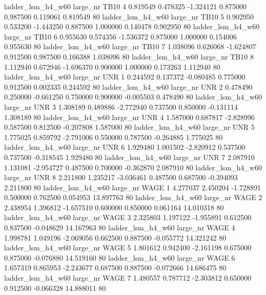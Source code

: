   ladder_lsm_h4_w60   large_nr     TB10                 4  0.819549  0.478325  -1.324121 0.875000 0.987500  0.119061    0.819549 80
  ladder_lsm_h4_w60   large_nr     TB10                 5  0.902950  0.533200  -1.443250 0.887500 1.000000  0.140478    0.902950 80
  ladder_lsm_h4_w60   large_nr     TB10                 6  0.955630  0.574356  -1.536372 0.875000 1.000000  0.154006    0.955630 80
  ladder_lsm_h4_w60   large_nr     TB10                 7  1.038096  0.626068  -1.624807 0.912500 0.987500  0.166388    1.038096 80
  ladder_lsm_h4_w60   large_nr     TB10                 8  1.112940  0.672946  -1.696370 0.900000 1.000000  0.173263    1.112940 80
  ladder_lsm_h4_w60   large_nr      UNR                 1  0.244592  0.137372  -0.080485 0.775000 0.912500  0.002335    0.244592 80
  ladder_lsm_h4_w60   large_nr      UNR                 2  0.478490  0.250000  -0.661250 0.750000 0.900000 -0.005503    0.478490 80
  ladder_lsm_h4_w60   large_nr      UNR                 3  1.308189  0.489886  -2.772940 0.737500 0.850000 -0.131114    1.308189 80
  ladder_lsm_h4_w60   large_nr      UNR                 4  1.587000  0.687817  -2.828996 0.587500 0.812500 -0.207808    1.587000 80
  ladder_lsm_h4_w60   large_nr      UNR                 5  1.775025  0.859792  -2.791006 0.550000 0.787500 -0.264885    1.775025 80
  ladder_lsm_h4_w60   large_nr      UNR                 6  1.929480  1.001502  -2.820912 0.537500 0.737500 -0.318545    1.929480 80
  ladder_lsm_h4_w60   large_nr      UNR                 7  2.087910  1.131081  -2.954727 0.487500 0.700000 -0.362870    2.087910 80
  ladder_lsm_h4_w60   large_nr      UNR                 8  2.211800  1.235217  -3.036461 0.487500 0.687500 -0.394093    2.211800 80
  ladder_lsm_h4_w60   large_nr     WAGE                 1  4.277037  2.450204  -1.728891 0.500000 0.762500  0.054953   13.897763 80
  ladder_lsm_h4_w60   large_nr     WAGE                 2  2.438954  1.396812  -1.657510 0.600000 0.850000  0.061164   14.010318 80
  ladder_lsm_h4_w60   large_nr     WAGE                 3  2.325803  1.197122  -1.955891 0.612500 0.837500 -0.048629   14.167963 80
  ladder_lsm_h4_w60   large_nr     WAGE                 4  1.998781  1.049196  -2.069056 0.662500 0.887500 -0.055772   14.321242 80
  ladder_lsm_h4_w60   large_nr     WAGE                 5  1.801612  0.942400  -2.161198 0.675000 0.875000 -0.076880   14.519160 80
  ladder_lsm_h4_w60   large_nr     WAGE                 6  1.657319  0.865953  -2.243677 0.687500 0.887500 -0.072666   14.686475 80
  ladder_lsm_h4_w60   large_nr     WAGE                 7  1.480557  0.787712  -2.303812 0.650000 0.912500 -0.066328   14.888011 80
